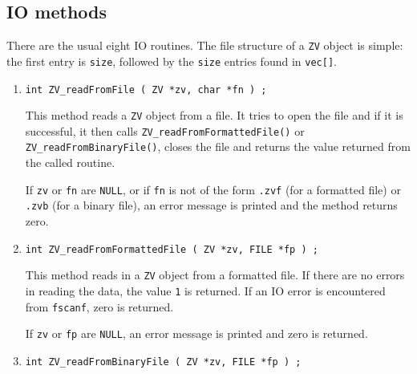 \subsection{IO methods}
\label{subsection:ZV:proto:IO}
\par
There are the usual eight IO routines.
The file structure of a {\tt ZV} object is simple:
the first entry is {\tt size}, followed by the {\tt size} entries
found in {\tt vec[]}.
\par
\begin{enumerate}
\item
\begin{verbatim}
int ZV_readFromFile ( ZV *zv, char *fn ) ;
\end{verbatim}
\par
This method reads a {\tt ZV} object from a file.
It tries to open the file and if it is successful, 
it then calls {\tt ZV\_readFromFormattedFile()} or
{\tt ZV\_readFromBinaryFile()}, 
closes the file
and returns the value returned from the called routine.
\par {}
If {\tt zv} or {\tt fn} are {\tt NULL}, 
or if {\tt fn} is not of the form
{\tt *.zvf} (for a formatted file) 
or {\tt *.zvb} (for a binary file),
an error message is printed and the method returns zero.
\item
\begin{verbatim}
int ZV_readFromFormattedFile ( ZV *zv, FILE *fp ) ;
\end{verbatim}
\par
This method reads in a {\tt ZV} object from a formatted file.
If there are no errors in reading the data, 
the value {\tt 1} is returned.
If an IO error is encountered from {\tt fscanf}, zero is returned.
\par {}
If {\tt zv} or {\tt fp} are {\tt NULL},
an error message is printed and zero is returned.
\item
\begin{verbatim}
int ZV_readFromBinaryFile ( ZV *zv, FILE *fp ) ;
\end{verbatim}

\end{enumerate}
